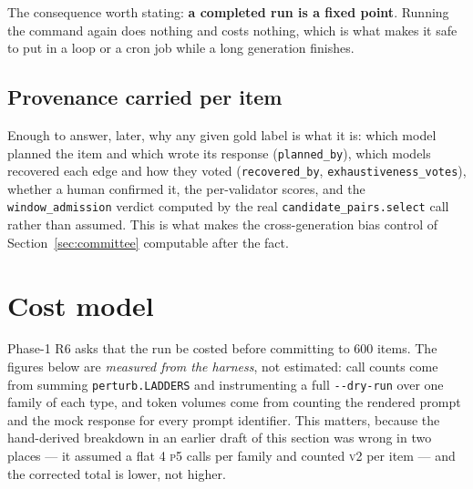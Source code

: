 \documentclass[11pt]{article}
\newcommand{\pymod}[1]{\texttt{#1}}
\begin{document}
\noindent The consequence worth stating: \textbf{a completed run is a fixed point}. Running the
command again does nothing and costs nothing, which is what makes it safe to put in a loop or a
cron job while a long generation finishes.

\subsection{Provenance carried per item}

Enough to answer, later, why any given gold label is what it is: which model planned the item and
which wrote its response (\texttt{planned\_by}), which models recovered each edge and how they
voted (\texttt{recovered\_by}, \texttt{exhaustiveness\_votes}), whether a human confirmed it, the
per-validator scores, and the \texttt{window\_admission} verdict computed by the real
\texttt{candidate\_pairs.select} call rather than assumed. This is what makes the cross-generation
bias control of Section~\ref{sec:committee} computable after the fact.

\section{Cost model}
\label{sec:cost}

Phase-1 R6 asks that the run be costed before committing to 600 items. The figures below are
\emph{measured from the harness}, not estimated: call counts come from summing
\pymod{perturb.LADDERS} and instrumenting a full \texttt{-{}-dry-run} over one family of each type,
and token volumes come from counting the rendered prompt and the mock response for every prompt
identifier. This matters, because the hand-derived breakdown in an earlier draft of this section was
wrong in two places --- it assumed a flat 4 \textsc{p5} calls per family and counted \textsc{v2} per
item --- and the corrected total is lower, not higher.
\end{document}
